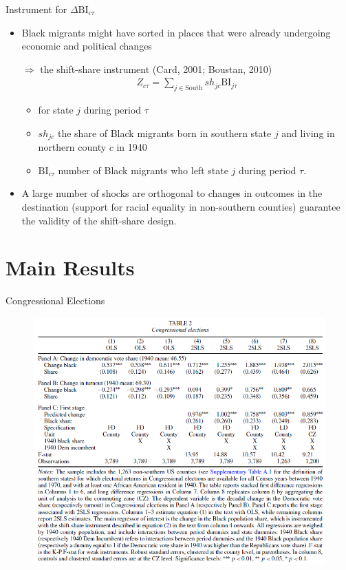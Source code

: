 \documentclass[dvipdfmx,11pt]{beamer}
\begin{document}
\begin{frame}{Instrument for $\Delta \text{BI}_{c \tau}$}
  \begin{itemize}
    \item Black migrants might have sorted in places that were already undergoing economic and political changes
    
    $\Rightarrow$ the shift-share instrument (Card, 2001; Boustan, 2010)
    \begin{align*}
      Z_{c\tau} = \sum_{j \in \text{South}} sh_{jc} \text{BI}_{j\tau}
    \end{align*}
    \begin{itemize}
      \item for state $j$ during period $\tau$
      \item $sh_{jc}$ the share of Black migrants born in southern state $j$ and living in northern county $c$ in 1940
      \item $\text{BI}_{c \tau}$ number of Black migrants who left state $j$ during period $\tau$.
    \end{itemize}
    \item A large number of shocks are orthogonal to changes in outcomes in the destination (support for racial equality in non-southern counties) guarantee the validity of the shift-share design.
  \end{itemize}
\end{frame}

\section{Main Results}
\frame{\sectionpage}

\begin{frame}{Congressional Elections}
  \begin{figure}
    \centering
    \includegraphics[scale = .4]{fig_tab/os20220708/T2.png}
  \end{figure}
\end{frame}
\end{document}
